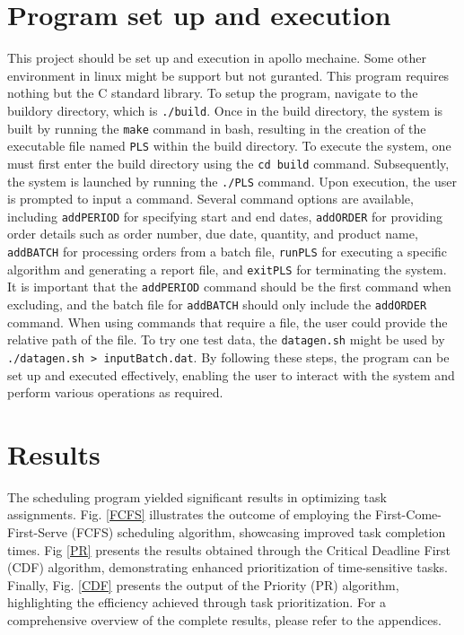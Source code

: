 \documentclass{ieeeaccess}
\begin{document}
\section{Program set up and execution}
This project should be set up and execution in apollo mechaine. Some other environment in linux might be support but not guranted. This program requires nothing but the C standard library. To setup the program, navigate to the buildory directory, which is \texttt{./build}. Once in the build directory, the system is built by running the \texttt{make} command in bash, resulting in the creation of the executable file named \texttt{PLS} within the build directory. To execute the system, one must first enter the build directory using the \texttt{cd build} command. Subsequently, the system is launched by running the \texttt{./PLS} command. Upon execution, the user is prompted to input a command. Several command options are available, including \texttt{addPERIOD} for specifying start and end dates, \texttt{addORDER} for providing order details such as order number, due date, quantity, and product name, \texttt{addBATCH} for processing orders from a batch file, \texttt{runPLS} for executing a specific algorithm and generating a report file, and \texttt{exitPLS} for terminating the system. It is important that the \texttt{addPERIOD} command should be the first command when excluding, and the batch file for \texttt{addBATCH} should only include the \texttt{addORDER} command. When using commands that require a file, the user could provide the relative path of the file. To try one test data, the \texttt{datagen.sh} might be used by \texttt{./datagen.sh > inputBatch.dat}. By following these steps, the program can be set up and executed effectively, enabling the user to interact with the system and perform various operations as required.

\section{Results}
The scheduling program yielded significant results in optimizing task assignments. Fig. \ref{FCFS} illustrates the outcome of employing the First-Come-First-Serve (FCFS) scheduling algorithm, showcasing improved task completion times. Fig \ref{PR} presents the results obtained through the Critical Deadline First (CDF) algorithm, demonstrating enhanced prioritization of time-sensitive tasks. Finally, Fig. \ref{CDF} presents the output of the Priority (PR) algorithm, highlighting the efficiency achieved through task prioritization. For a comprehensive overview of the complete results, please refer to the appendices.
\end{document}
